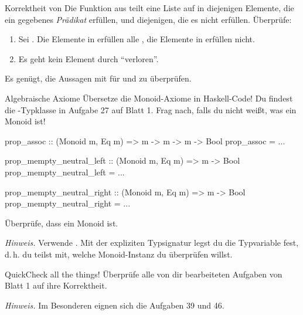\documentclass{uebblatt}
\newcommand{\refaufgabe}[1]{#1} %
\begin{document}
\begin{aufgabe}{Korrektheit von }
  Die Funktion  aus
   teilt eine Liste auf in diejenigen Elemente, die ein
  gegebenes \emph{Prädikat}  erfüllen, und
  diejenigen, die es nicht erfüllen. Überprüfe:
  
  \begin{enumerate}
    \item Sei . Die Elemente in  erfüllen alle , die Elemente in  erfüllen  nicht.
    \item Es geht kein Element durch  "`verloren"'.
  \end{enumerate}

  {\scriptsize Es genügt, die Aussagen mit  für
   und  zu überprüfen.}
\end{aufgabe}

\begin{aufgabe}{Algebraische Axiome}
  Übersetze die Monoid-Axiome in Haskell-Code! Du findest die
  -Typklasse in Aufgabe \refaufgabe{27} auf Blatt 1. Frag
  nach, falls du nicht weißt, was ein Monoid ist!
  
\begin{haskellcode}
prop_assoc :: (Monoid m, Eq m) => m -> m -> m -> Bool
prop_assoc = ...

prop_mempty_neutral_left :: (Monoid m, Eq m) => m -> Bool
prop_mempty_neutral_left = ...

prop_mempty_neutral_right :: (Monoid m, Eq m) => m -> Bool
prop_mempty_neutral_right = ...
\end{haskellcode}
  Überprüfe, dass \haskellinline{[Char]} ein Monoid ist.

  {\scriptsize \emph{Hinweis.} Verwende
  . Mit der expliziten Typsignatur legst du die
  Typvariable  fest, d.\,h. du teilst
  mit, welche Monoid-Instanz du überprüfen willst.}
\end{aufgabe}

\begin{aufgabe}{QuickCheck all the things!}
  Überprüfe alle von dir bearbeiteten Aufgaben von Blatt 1 auf ihre Korrektheit.
  
  {\scriptsize \emph{Hinweis.} Im Besonderen eignen sich die Aufgaben \refaufgabe{39} und \refaufgabe{46}.}
\end{aufgabe}
\end{document}
